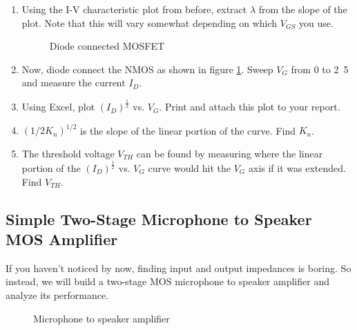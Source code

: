 \documentclass{article}
\begin{document}
\begin{enumerate}
	\item Using the I-V characteristic plot from before, extract $\lambda$ from the slope of the plot. Note that this will vary somewhat depending on which $V_{GS}$ you use.
	
		\begin{figure}[!htb]
			
			\centerline{\box\graph}
			\caption{Diode connected MOSFET}
			\label{diode}
		\end{figure}
		
	\item Now, diode connect the NMOS as shown in figure \ref{diode}. Sweep $V_{G}$ from \unit{0}{\volt} to \unit{2.5}{\volt} and measure the current $I_{D}$.
	\item Using Excel, plot $(I_{D})^{\frac{1}{2}}$ vs. $V_{G}$. Print and attach this plot to your report.
	\item $(1/2K_n)^{1/2}$ is the slope of the linear portion of the curve. Find $K_n$. 
	\item The threshold voltage $V_{TH}$ can be found by measuring where the linear portion of the $\left(I_{D}\right)^{\frac{1}{2}}$ vs. $V_{G}$ curve would hit the $V_{G}$ axis if it was extended. Find $V_{TH}$. 
\end{enumerate}

\subsection{Simple Two-Stage Microphone to Speaker MOS Amplifier}
If you haven't noticed by now, finding input and output impedances is boring. So instead, we will build a two-stage MOS microphone to speaker amplifier and analyze its performance.

	\begin{figure}[!htb]
		
		\centerline{\box\graph}
		\caption{Microphone to speaker amplifier}
		\label{amp}
	\end{figure}
\end{document}
